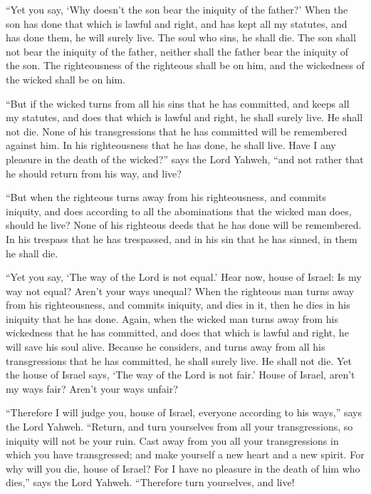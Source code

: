  ``Yet you say, `Why doesn't the son bear the iniquity of
the father?' When the son has done that which is lawful and right, and
has kept all my statutes, and has done them, he will surely live.
 The soul who sins, he shall die. The son shall not bear
the iniquity of the father, neither shall the father bear the iniquity
of the son. The righteousness of the righteous shall be on him, and the
wickedness of the wicked shall be on him.

 ``But if the wicked turns from all his sins that he has
committed, and keeps all my statutes, and does that which is lawful and
right, he shall surely live. He shall not die.  None of
his transgressions that he has committed will be remembered against him.
In his righteousness that he has done, he shall live. 
Have I any pleasure in the death of the wicked?'' says the Lord Yahweh,
``and not rather that he should return from his way, and live?

 ``But when the righteous turns away from his
righteousness, and commits iniquity, and does according to all the
abominations that the wicked man does, should he live? None of his
righteous deeds that he has done will be remembered. In his trespass
that he has trespassed, and in his sin that he has sinned, in them he
shall die.

 ``Yet you say, `The way of the Lord is not equal.' Hear
now, house of Israel: Is my way not equal? Aren't your ways unequal?
 When the righteous man turns away from his
righteousness, and commits iniquity, and dies in it, then he dies in his
iniquity that he has done.  Again, when the wicked man
turns away from his wickedness that he has committed, and does that
which is lawful and right, he will save his soul alive. 
Because he considers, and turns away from all his transgressions that he
has committed, he shall surely live. He shall not die. 
Yet the house of Israel says, `The way of the Lord is not fair.' House
of Israel, aren't my ways fair? Aren't your ways unfair?

 ``Therefore I will judge you, house of Israel, everyone
according to his ways,'' says the Lord Yahweh. ``Return, and turn
yourselves from all your transgressions, so iniquity will not be your
ruin.  Cast away from you all your transgressions in
which you have transgressed; and make yourself a new heart and a new
spirit. For why will you die, house of Israel?  For I
have no pleasure in the death of him who dies,'' says the Lord Yahweh.
``Therefore turn yourselves, and live!

